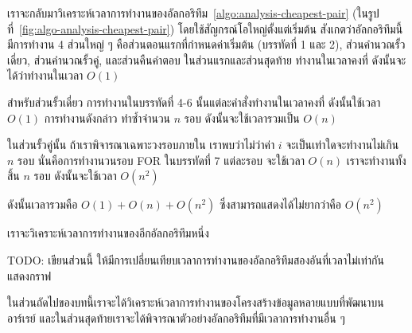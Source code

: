 เรา{\wbr}จะ{\wbr}กลับ{\wbr}มา{\wbr}วิเคราะห์{\wbr}เวลา{\wbr}การ{\wbr}ทำงาน{\wbr}ของ{\wbr}อัล{\wbr}กอ{\wbr}ริ{\wbr}ทึม~\ref{algo:analysis-cheapest-pair}
(ใน{\wbr}รูป{\wbr}ที่~\ref{fig:algo-analysis-cheapest-pair}) โดย{\wbr}ใช้{\wbr}สัญกรณ์{\wbr}โอ{\wbr}ใหญ่{\wbr}ตั้งแต่{\wbr}เริ่มต้น{\wbr}
สังเกต{\wbr}ว่า{\wbr}อัล{\wbr}กอ{\wbr}ริ{\wbr}ทึม{\wbr}นี้{\wbr}มี{\wbr}การ{\wbr}ทำงาน 4 ส่วนใหญ่ ๆ คือ{\wbr}ส่วน{\wbr}ตอนแรก{\wbr}ที่{\wbr}กำหนด{\wbr}ค่า{\wbr}เริ่มต้น (บรรทัด{\wbr}ที่ 1
และ 2), ส่วน{\wbr}คำนวณ{\wbr}รั้ว{\wbr}เดี่ยว, ส่วน{\wbr}คำนวณ{\wbr}รั้ว{\wbr}คู่, และ{\wbr}ส่วน{\wbr}คืนคำ{\wbr}ตอบ ใน{\wbr}ส่วน{\wbr}แรก{\wbr}และ{\wbr}ส่วน{\wbr}สุดท้าย{\wbr}
ทำงาน{\wbr}ใน{\wbr}เวลา{\wbr}คงที่ ดังนั้น{\wbr}จะ{\wbr}ได้{\wbr}ว่า{\wbr}ทำงาน{\wbr}ใน{\wbr}เวลา $O(1)$

สำหรับ{\wbr}ส่วน{\wbr}รั้ว{\wbr}เดี่ยว การ{\wbr}ทำงาน{\wbr}ใน{\wbr}บรรทัด{\wbr}ที่ 4-6 นั้น{\wbr}แต่ละ{\wbr}คำสั่ง{\wbr}ทำงาน{\wbr}ใน{\wbr}เวลา{\wbr}คงที่{\wbr}
ดังนั้น{\wbr}ใช้เวลา $O(1)$ การ{\wbr}ทำงาน{\wbr}ดังกล่าว ทำ{\wbr}ซ้ำ{\wbr}จำนวน $n$ รอบ ดังนั้น{\wbr}จะ{\wbr}ใช้เวลา{\wbr}รวม{\wbr}เป็น{\wbr}
$O(n)$

ใน{\wbr}ส่วน{\wbr}รั้ว{\wbr}คู่{\wbr}นั้น ถ้า{\wbr}เรา{\wbr}พิจารณา{\wbr}เฉพาะ{\wbr}วงรอบ{\wbr}ภายใน เรา{\wbr}พบ{\wbr}ว่า{\wbr}ไม่ว่า{\wbr}ค่า $i$
จะ{\wbr}เป็น{\wbr}เท่าใด{\wbr}จะ{\wbr}ทำงาน{\wbr}ไม่{\wbr}เกิน $n$ รอบ นั่น{\wbr}คือ{\wbr}การ{\wbr}ทำงาน{\wbr}วน{\wbr}รอบ FOR ใน{\wbr}บรรทัด{\wbr}ที่ 7
แต่ละ{\wbr}รอบ จะ{\wbr}ใช้เวลา $O(n)$ เรา{\wbr}จะ{\wbr}ทำงาน{\wbr}ทั้งสิ้น $n$ รอบ ดังนั้น{\wbr}จะ{\wbr}ใช้เวลา $O(n^2)$

ดังนั้น{\wbr}เวลา{\wbr}รวม{\wbr}คือ $O(1) + O(n) + O(n^2)$ ซึ่ง{\wbr}สามารถ{\wbr}แสดง{\wbr}ได้{\wbr}ไม่{\wbr}ยาก{\wbr}ว่า{\wbr}คือ $O(n^2)$

เรา{\wbr}จะ{\wbr}วิเคราะห์{\wbr}เวลา{\wbr}การ{\wbr}ทำงาน{\wbr}ของ{\wbr}อีก{\wbr}อัล{\wbr}กอ{\wbr}ริ{\wbr}ทึม{\wbr}หนึ่ง 

TODO: เขียน{\wbr}ส่วน{\wbr}นี้ ให้{\wbr}มี{\wbr}การ{\wbr}เปลี่ยน{\wbr}เทียบ{\wbr}เวลา{\wbr}การ{\wbr}ทำงาน{\wbr}ของ{\wbr}อัล{\wbr}กอ{\wbr}ริ{\wbr}ทึม{\wbr}สอง{\wbr}อัน{\wbr}ที่{\wbr}เวลา{\wbr}ไม่{\wbr}เท่า{\wbr}กัน แสดง{\wbr}กราฟ{\wbr}

ใน{\wbr}ส่วน{\wbr}ถัด{\wbr}ไป{\wbr}ของ{\wbr}บท{\wbr}นี้{\wbr}เรา{\wbr}จะ{\wbr}ได้{\wbr}วิเคราะห์{\wbr}เวลา{\wbr}การ{\wbr}ทำงาน{\wbr}ของ{\wbr}โครงสร้าง{\wbr}ข้อมูล{\wbr}หลาย{\wbr}แบบ{\wbr}ที่{\wbr}พัฒนา{\wbr}บน{\wbr}อาร์เรย์
และ{\wbr}ใน{\wbr}ส่วน{\wbr}สุดท้าย{\wbr}เรา{\wbr}จะ{\wbr}ได้{\wbr}พิจารณา{\wbr}ตัวอย่าง{\wbr}อัล{\wbr}กอ{\wbr}ริ{\wbr}ทึม{\wbr}ที่{\wbr}มี{\wbr}เวลา{\wbr}การ{\wbr}ทำงาน{\wbr}อื่น ๆ

